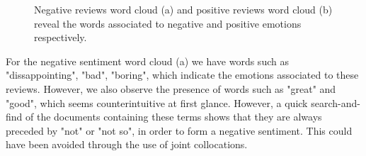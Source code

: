 \documentclass[a4paper,10pt, openright]{article}
\begin{document}
\begin{figure}[H]
	\begin{center}
		\caption{Negative reviews word cloud (a) and positive reviews word cloud (b) reveal the words associated to negative and positive emotions respectively.}
		\label{fig:sentimentword}
	\end{center}
\end{figure}

For the negative sentiment word cloud (a) we have words such as "dissappointing", "bad", "boring", which indicate the emotions associated to these reviews. However, we also observe the presence of words such as "great" and "good", which seems counterintuitive at first glance. However, a quick search-and-find of the documents containing these terms shows that they are always preceded by "not" or "not so", in order to form a negative sentiment. This could have been avoided through the use of joint collocations.
\end{document}
